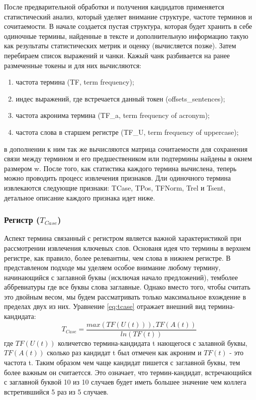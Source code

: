 После предварительной обработки и получения кандидатов применяется статистический анализ, который уделяет внимание структуре, частоте терминов и сочитаемости.
В начале создается пустая структура, которая будет хранить в себе одиночные термины, найденные в тексте и дополнительную информацию такую как результаты статистических метрик и оценку (вычисляется позже).
Затем перебираем список выражений и чанки.
Кажый чанк разбивается на ранее размеченные токены и для них вычисляются:
\begin{enumerate}
	\item частота термина (TF, term frequency);
	\item индес выражений, где встречается данный токен (offsets\_sentences);
	\item частота акронима термина (TF\_a, term frequency of acronym);
	\item частота слова в старшем регистре (TF\_U, term frequency of uppercase);
\end{enumerate}
в дополнении к ним так же вычисляются матрица сочитаемости для сохранения связи между термином и его предшествеником или подтермины найдены в окнем размером w.
После того, как статистика каждого термина вычислена, теперь можно проводить процесс извлечения признаков.
Дли одиночного термина извлекаются следующие признаки: TCase, TPos, TFNorm, Trel и Tsent, детальное описание каждого признака идет ниже.

\subsubsection{Регистр ($T_{Case}$)}

Аспект термина связанный с регистром является важной характеристикой при рассмотрении извлечения ключевых слов.
Основаня идея что термины в верхнем регистре, как правило, более релевантны, чем слова в нижнем регистре. 
В представленом подходе мы уделяем особое внимание любому термину, начинающийся с заглавной буквы (исключая начало предложений), темболее аббревиатуры где все буквы слова заглавные.
Однако вместо того, чтобы считать это двойным весом, мы будем рассматривать только максимальное вхождение в пределах двух из них. 
Уравнение \eqref{eq:tcase} отражает внешний вид термина-кандидата:
\begin{equation}
	\label{eq:tcase}
	T_{Case} = \frac{max(TF(U(t))), TF(A(t))}{ln(TF(t))}
\end{equation}
где $TF(U(t))$ количетсво термина-кандидата t нающегося с залавной буквы, $TF(A(t))$ сколько раз кандидат t был отмечен как акроним и $TF(t)$ - это частота t.
Таким образом чем чаще кандидат пишется с заглавной буквы, тем более важным он считаетсся.
Это означает, что термин-кандидат, встречающийся с заглавной буквой 10 из 10 случаев будет иметь большее значение чем коллега встретившийся 5 раз из 5 случаев.

